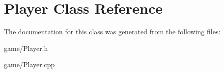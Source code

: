 \hypertarget{classPlayer}{}\section{Player Class Reference}
\label{classPlayer}


The documentation for this class was generated from the following files\+:\begin{DoxyCompactItemize}
\item 
game/Player.\+h\item 
game/Player.\+cpp\end{DoxyCompactItemize}

